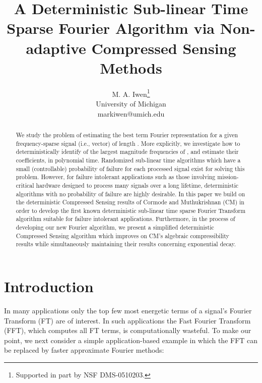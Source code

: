\documentclass{article}
\begin{document}
\pagestyle{empty}

\title{A Deterministic Sub-linear Time Sparse Fourier Algorithm via Non-adaptive Compressed Sensing Methods}
\author{M. A. Iwen\thanks{Supported in part by NSF DMS-0510203.}\\
University of Michigan\\
markiwen@umich.edu}

\maketitle
\thispagestyle{empty}

\begin{abstract}
We study the problem of estimating the best  term Fourier representation for a given frequency-sparse signal (i.e., vector)  of length .  More explicitly, we investigate how to deterministically identify  of the largest magnitude frequencies of , and estimate their coefficients, in polynomial time.  Randomized sub-linear time algorithms which have a small (controllable) probability of failure for each processed signal exist for solving this problem.  However, for failure intolerant applications such as those involving mission-critical hardware designed to process many signals over a long lifetime, deterministic algorithms with no probability of failure are highly desirable.  In this paper we build on the deterministic Compressed Sensing results of Cormode and Muthukrishnan (CM) \cite{CMDetCS3,CMDetCS1,CMDetCS2} in order to develop the first known deterministic sub-linear time sparse Fourier Transform algorithm suitable for failure intolerant applications.  Furthermore, in the process of developing our new Fourier algorithm, we present a simplified deterministic Compressed Sensing algorithm which improves on CM's algebraic compressibility results while simultaneously maintaining their results concerning exponential decay.
\end{abstract}

\section{Introduction}

In many applications only the top few most energetic terms of a signal's Fourier Transform (FT) are of interest.  In such applications the Fast Fourier Transform (FFT), which computes all FT terms, is computationally wasteful.  To make our point, we next consider a simple application-based example in which the FFT can be replaced by faster approximate Fourier methods:\\
\end{document}

